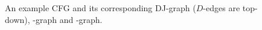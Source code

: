 {\begin{figure}
\caption{\label{fig:classical_construction_algorithm:iDF}An example CFG and its 
corresponding DJ-graph ($D$-edges are top-down), \DF-graph and \iDF-graph.}
\end{figure}

}
